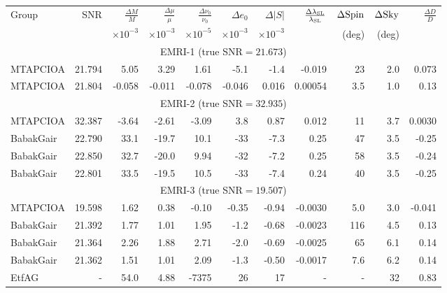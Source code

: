 \documentclass{iopart}
\begin{document}
\begin{table}
\begin{center}
\begin{tabular}{|l|rrrrrrrrrr|}
\hline
Group & SNR & $\frac{\Delta M}{M}$ & $\frac{\Delta \mu}{\mu}$ & $ \frac{\Delta \nu_0}{\nu_0} $ &  $\Delta  e_0$ &  $\Delta |S|$ & $\frac{\Delta \lambda_{\rm SL}}{\lambda_{\rm SL}}$ & $\Delta{\rm Spin}$ & $\Delta{\rm Sky}$ & $\frac{\Delta D}{D}$ \\
& & $\times 10^{-3}$ & $\times 10^{-3}$ & $\times 10^{-5}$ & $\times 10^{-3}$  & $\times 10^{-3}$ & & (deg) & (deg) &    \\
\hline

\multicolumn{11}{|c|}{EMRI-1 (true SNR$=21.673$)} \\
MTAPCIOA  & 21.794 & 5.05  &  3.29 &  1.61  &  -5.1  &  -1.4  &  -0.019  &  23  &  2.0  &  0.073  \\ %
MTAPCIOA & 21.804 & -0.058  &  -0.011  &  -0.078  &  -0.046  &  0.016  &  0.00054  &  3.5  &  1.0  &  0.13 \\ %
\hline

\multicolumn{11}{|c|}{EMRI-2 (true SNR$=32.935$)} \\
MTAPCIOA & 32.387 & -3.64  &  -2.61  &  -3.09  &  3.8  &  0.87  &  0.012  &  11  &  3.7  &  0.0030  \\ %
BabakGair & 22.790 & 33.1  &  -19.7  &  10.1  &  -33  &  -7.3  &  0.25  &  47  &  3.5  &  -0.25  \\  %
BabakGair & 22.850 & 32.7  &  -20.0  &  9.94  &  -32 &  -7.2  &  0.25  &  58  &  3.5  &  -0.24  \\ %
BabakGair & 22.801 & 33.5  &  -19.5  &  10.5  &  -33  &  -7.4  &  0.24  &  40  &  3.5  &  -0.25  \\     %
\hline

\multicolumn{11}{|c|}{EMRI-3 (true SNR$=19.507$)} \\
MTAPCIOA & 19.598 & 1.62  &  0.38 &  -0.10  &  -0.35  &  -0.94  &  -0.0030  &  5.0  &  3.0  &  -0.041  \\  %
BabakGair & 21.392 & 1.77  &  1.01  &  1.95  &  -1.2 &  -0.68  &  -0.0023  &  116  &  4.5  &  0.13  \\   %
BabakGair & 21.364 & 2.26  &  1.88  &  2.71  &  -2.0  &  -0.69  &  -0.0025  &  65  &  6.1  &  0.14  \\    %
BabakGair & 21.362 & 1.51  &  1.01  &  2.09  &  -1.3  &  -0.50  &  -0.0017  &  7.6  &  6.2  &  0.14  \\  %
EtfAG & - & 54.0 &  4.88  &  -7375  &  26  &  17  &  -  &  -  &  32  &  0.83  \\        
\hline


\end{tabular}
\end{center}
\end{table}
\end{document}
